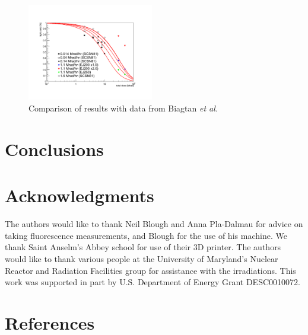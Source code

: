 \documentclass[review]{elsarticle}
\begin{document}
\begin{figure}[!ht]
\begin{center}
\includegraphics[width=0.49\textwidth]{./figures/Biagtan.pdf}
\caption{
Comparison of results with data from Biagtan {\it et al.}~\cite{Biagtan1996125}
}
\label{fig:ej200doping1x}
\end{center}
\end{figure}



\section{Conclusions}

\section{Acknowledgments}
The authors would like to thank Neil Blough and Anna Pla-Dalmau for advice on taking fluorescence measurements, and Blough for the use of his machine. We thank Saint Anselm's Abbey school for use of their 3D printer.   
The authors would like to thank {\color{red} various people} at
the University of Maryland's Nuclear Reactor and Radiation
Facilities group for assistance
with the irradiations.
This work was supported in part by U.S. Department of Energy Grant DESC0010072.

\section*{References}


\end{document}
